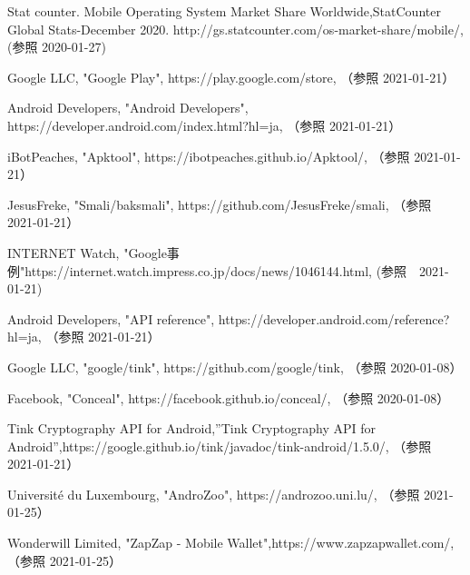 \newpage
\begin{thebibliography}{99}

Stat counter. Mobile Operating System Market Share Worldwide,StatCounter Global Stats-December 2020. http://gs.statcounter.com/os-market-share/mobile/,(参照 2020-01-27)

Google LLC, "Google Play", https://play.google.com/store, （参照 2021-01-21）

Android Developers, "Android Developers", https://developer.android.com/index.html?hl=ja, （参照 2021-01-21）

iBotPeaches, "Apktool", https://ibotpeaches.github.io/Apktool/, （参照 2021-01-21）

JesusFreke, "Smali/baksmali", https://github.com/JesusFreke/smali, （参照 2021-01-21）


INTERNET Watch, "Google事例"https://internet.watch.impress.co.jp/docs/news/1046144.html, (参照　2021-01-21)

Android Developers, "API reference", https://developer.android.com/reference?hl=ja, （参照 2021-01-21）

Google LLC, "google/tink", https://github.com/google/tink, （参照 2020-01-08）

Facebook, "Conceal", https://facebook.github.io/conceal/, （参照 2020-01-08）

Tink Cryptography API for Android,''Tink Cryptography API for Android'',https://google.github.io/tink/javadoc/tink-android/1.5.0/, （参照 2021-01-21）

Université du Luxembourg, "AndroZoo",  https://androzoo.uni.lu/, （参照 2021-01-25）

Wonderwill Limited, "ZapZap - Mobile Wallet",https://www.zapzapwallet.com/,（参照 2021-01-25）


\end{thebibliography}